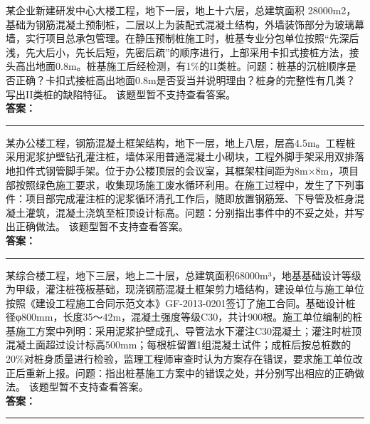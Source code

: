 \documentclass[UTF8,fontset=fandol,11pt]{ctexart}
\newcommand{\answerline}{\textcolor{answerred}{\rule{2.4cm}{0.7pt}}}
\begin{document}
\vspace{0.2em}

\begin{quizbox}[title={第 12 题}]
某企业新建研发中心大楼工程，地下一层，地上十六层，总建筑面积 28000m2，基础为钢筋混凝土预制桩，二层以上为装配式混凝土结构，外墙装饰部分为玻璃幕墙，实行项目总承包管理。在静压预制桩施工时，桩基专业分包单位按照“先深后浅，先大后小，先长后短，先密后疏”的顺序进行，上部采用卡扣式接桩方法，接头高出地面0.8m。桩基施工后经检测，有1\%的II类桩。问题：桩基的沉桩顺序是否正确？卡扣式接桩高出地面0.8m是否妥当并说明理由？桩身的完整性有几类？写出II类桩的缺陷特征。 该题型暂不支持查看答案。\\
\textbf{\textcolor{answerred}{答案：}} \answerline
\end{quizbox}

\vspace{0.2em}

\begin{quizbox}[title={第 13 题}]
某办公楼工程，钢筋混凝土框架结构，地下一层，地上八层，层高4.5m。工程桩采用泥浆护壁钻孔灌注桩，墙体采用普通混凝土小砌块，工程外脚手架采用双排落地扣件式钢管脚手架。位于办公楼顶层的会议室，其框架柱间距为8m×8m，项目部按照绿色施工要求，收集现场施工废水循环利用。在施工过程中，发生了下列事件：项目部完成灌注桩的泥浆循环清孔工作后，随即放置钢筋笼、下导管及桩身混凝土灌筑，混凝土浇筑至桩顶设计标高。问题：分别指出事件中的不妥之处，并写出正确做法。 该题型暂不支持查看答案。\\
\textbf{\textcolor{answerred}{答案：}} \answerline
\end{quizbox}

\vspace{0.2em}

\begin{quizbox}[title={第 14 题}]
某综合楼工程，地下三层，地上二十层，总建筑面积68000m³，地基基础设计等级为甲级，灌注桩筏板基础，现浇钢筋混凝土框架剪力墙结构，建设单位与施工单位按照《建设工程施工合同示范文本》GF-2013-0201签订了施工合同。基础设计桩径φ800mm，长度35～42m，混凝土强度等级C30，共计900根。施工单位编制的桩基施工方案中列明：采用泥浆护壁成孔、导管法水下灌注C30混凝土；灌注时桩顶混凝土面超过设计标高500mm；每根桩留置1组混凝土试件；成桩后按总桩数的20\%对桩身质量进行检验，监理工程师审查时认为方案存在错误，要求施工单位改正后重新上报。问题：指出桩基施工方案中的错误之处，并分别写出相应的正确做法。 该题型暂不支持查看答案。\\
\textbf{\textcolor{answerred}{答案：}} \answerline
\end{quizbox}
\end{document}
